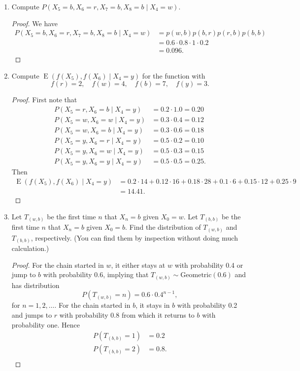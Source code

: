 \documentclass[oneside,reqno]{amsart}
\DeclareMathOperator{\E}{\mathrm{E}}
\newcommand{\Geom}{\text{Geometric}}
\theoremstyle{definition}
\begin{document}
\begin{enumerate}
\item
Compute $P(X_5 = b, X_6 = r, X_7 = b, X_8 = b \mid X_4 = w)$.
\begin{proof}
We have 
\begin{align*}
	P(X_5 = b, X_6 = r, X_7 = b, X_8 = b \mid X_4 = w) &= p(w,b)p(b,r)p(r,b) p(b,b) \\
	&= 0.6 \cdot 0.8 \cdot 1 \cdot 0.2 \\
	&= 0.096.
\end{align*}
\end{proof}
\item
Compute $\E(f(X_5), f(X_6) \mid X_4 = y)$ for the function with 
\[
	f(r) = 2, \quad f(w) = 4, \quad f(b) = 7, \quad f(y) =3.
\]
\begin{proof}
First note that
\begin{align*}
	P(X_5 = r, X_6 = b \mid X_4 = y) &= 0.2 \cdot 1.0  =  0.20 \\
	P(X_5 = w, X_6 = w \mid X_4 = y) &= 0.3 \cdot 0.4 = 0.12 \\
	P(X_5 = w, X_6 = b \mid X_4 = y) &= 0.3 \cdot 0.6 = 0.18 \\	
	P(X_5 = y, X_6 = r \mid X_4 = y) &= 0.5 \cdot 0.2 = 0.10 \\
	P(X_5 = y, X_6 = w \mid X_4 = y) &= 0.5 \cdot 0.3 = 0.15 \\
	P(X_5 = y, X_6 = y \mid X_4 = y) &= 0.5 \cdot 0.5 = 0.25.
\end{align*}
Then
\begin{align*}
	\E(f(X_5), f(X_6) \mid X_4 = y) &= 0.2 \cdot 14 + 0.12 \cdot 16 + 0.18 \cdot 28 + 0.1 \cdot 6 + 0.15 \cdot 12 + 0.25 \cdot 9 \\
	&= 14.41.
\end{align*}
\end{proof}
\item
Let $T_{(w,b)}$ be the first time $n$ that $X_n = b$ given $X_0 = w$. Let $T_{(b,b)}$ be the first time $n$ that $X_n = b$ given $X_0 = b$. Find the distribution of $T_{(w,b)}$ and $T_{(b,b)}$, respectively. (You can find them by inspection without doing much calculation.)
\begin{proof}
For the chain started in $w$, it either stays at $w$ with probability 0.4 or jump to $b$ with probability 0.6, implying that $T_{(w,b)} \sim \Geom(0.6)$ and has distribution 
\[
	P(T_{(w,b)} = n) = 0.6 \cdot 0.4^{n-1},
\]
for $n=1,2,\dotsc$. For the chain started in $b$, it stays in $b$ with probability 0.2 and jumps to $r$ with probability 0.8 from which it returns to $b$ with probability one. Hence 
\begin{align*}
	P(T_{(b,b)} = 1) &= 0.2 \\
	P(T_{(b,b)} = 2) &= 0.8. \\
\end{align*}
\end{proof}
\end{enumerate}
\end{document}
